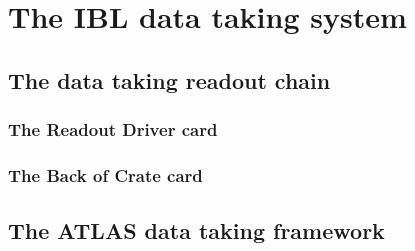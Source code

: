 \section{The IBL data taking system}\label{sec:IBL_DAQ}
\subsection{The data taking readout chain}
\subsubsection{The Readout Driver card}
\subsubsection{The Back of Crate card}
\subsection{The ATLAS data taking framework}
\pagebreak